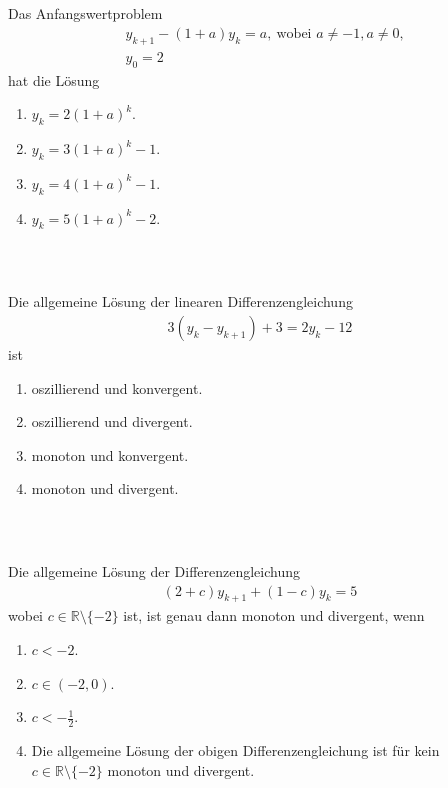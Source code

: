 \subsection*{}
Das Anfangswertproblem
\begin{align*}
&y_{k+1} -(1+a) y_k = a, \ \textrm{wobei } a \neq -1, a \neq 0,\\
&y_0 = 2
\end{align*}
hat die Lösung
\renewcommand{\labelenumi}{(\alph{enumi})}
\begin{enumerate}
\item 
$ y_k = 2 ( 1+a)^k $.
\item
$ y_k = 3 ( 1+a)^k  -1$.
\item
$ y_k = 4 ( 1+a)^k -1 $.
\item
$ y_k = 5 ( 1+a)^k -2$.
\end{enumerate}
\ \\
\subsection*{}
Die allgemeine Lösung der linearen Differenzengleichung
\begin{align*}
3 (y_k - y_{k+1})+ 3 = 2 y_k - 12 
\end{align*}
ist
\renewcommand{\labelenumi}{(\alph{enumi})}
\begin{enumerate}
\item
oszillierend und konvergent.
\item
oszillierend und divergent.	
\item 
monoton und konvergent.
\item
monoton und divergent.
\end{enumerate}
\ \\
\subsection*{}
Die allgemeine Lösung der Differenzengleichung
\begin{align*}
(2 + c) y_{k+1} + (1-c) y_k = 5
\end{align*}
wobei $c \in \mathbb{R} \setminus \lbrace -2 \rbrace$ ist, ist genau dann monoton und divergent, wenn
\renewcommand{\labelenumi}{(\alph{enumi})}
\begin{enumerate}
	\item 
	$ c < -2 $.
	\item
	$c \in (-2,0)$.
	\item
	$ c < -\frac{1}{2} $.
	\item
	Die allgemeine Lösung der obigen Differenzengleichung ist für kein $c \in \mathbb{R} \setminus \lbrace -2 \rbrace$ monoton und divergent.
\end{enumerate}